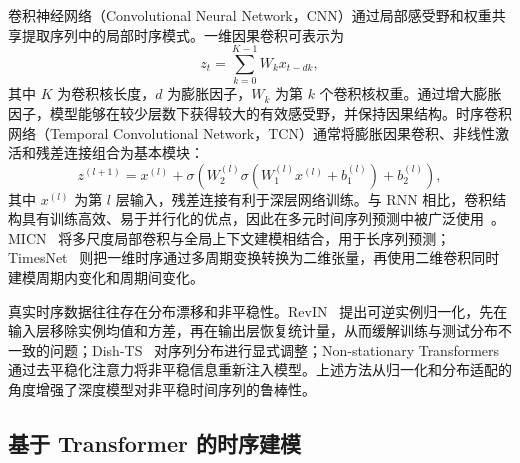 卷积神经网络（Convolutional Neural Network，CNN）通过局部感受野和权重共享提取序列中的局部时序模式。一维因果卷积可表示为
\begin{equation}
z_t = \sum_{k=0}^{K-1} W_k x_{t-d k},
\end{equation}
其中 $K$ 为卷积核长度，$d$ 为膨胀因子，$W_k$ 为第 $k$ 个卷积核权重。通过增大膨胀因子，模型能够在较少层数下获得较大的有效感受野，并保持因果结构。时序卷积网络（Temporal Convolutional Network，TCN）通常将膨胀因果卷积、非线性激活和残差连接组合为基本模块：
\begin{equation}
z^{(l+1)} = x^{(l)} + \sigma\!\left(W_{2}^{(l)} \sigma\!\left(W_{1}^{(l)} x^{(l)} + b_{1}^{(l)}\right) + b_{2}^{(l)}\right),
\end{equation}
其中 $x^{(l)}$ 为第 $l$ 层输入，残差连接有利于深层网络训练。与 RNN 相比，卷积结构具有训练高效、易于并行化的优点，因此在多元时间序列预测中被广泛使用~\cite{micn,cnn_related1}。MICN~\cite{micn} 将多尺度局部卷积与全局上下文建模相结合，用于长序列预测；TimesNet~\cite{timesnet} 则把一维时序通过多周期变换转换为二维张量，再使用二维卷积同时建模周期内变化和周期间变化。

真实时序数据往往存在分布漂移和非平稳性。RevIN~\cite{revin} 提出可逆实例归一化，先在输入层移除实例均值和方差，再在输出层恢复统计量，从而缓解训练与测试分布不一致的问题；Dish-TS~\cite{dishts} 对序列分布进行显式调整；Non-stationary Transformers~\cite{ns-trans} 通过去平稳化注意力将非平稳信息重新注入模型。上述方法从归一化和分布适配的角度增强了深度模型对非平稳时间序列的鲁棒性。

\subsection{基于 Transformer 的时序建模}

